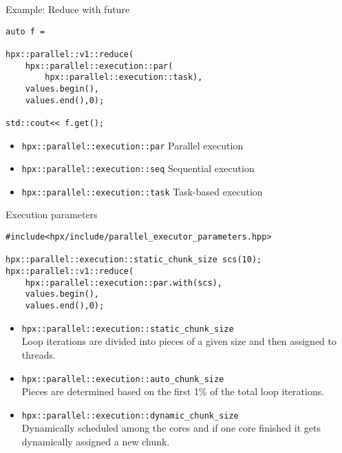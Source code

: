 \documentclass[12pt,t]{beamer}
\begin{document}
\begin{frame}[fragile]{Example: Reduce with future}


\begin{lstlisting}
auto f =

hpx::parallel::v1::reduce(
	hpx::parallel::execution::par(
		hpx::parallel::execution::task),
	values.begin(),
	values.end(),0);

std::cout<< f.get();
\end{lstlisting}

\begin{itemize}
\item \lstinline|hpx::parallel::execution::par| Parallel execution
\item \lstinline|hpx::parallel::execution::seq| Sequential execution
\item \lstinline|hpx::parallel::execution::task| Task-based execution
\end{itemize}

\end{frame}


\begin{frame}[fragile]{Execution parameters}


\begin{lstlisting}
#include<hpx/include/parallel_executor_parameters.hpp>

hpx::parallel::execution::static_chunk_size scs(10);
hpx::parallel::v1::reduce(
	hpx::parallel::execution::par.with(scs),
	values.begin(),
	values.end(),0);
\end{lstlisting}

\begin{itemize}
\item \lstinline|hpx::parallel::execution::static_chunk_size| \\
Loop iterations are divided into pieces of a given size and then assigned to threads.
\item \lstinline|hpx::parallel::execution::auto_chunk_size| \\
Pieces are determined based on the first 1\% of the total loop iterations. 
\item \lstinline|hpx::parallel::execution::dynamic_chunk_size| \\
Dynamically scheduled among the cores and if one core finished it gets dynamically assigned a new chunk.


\end{itemize}

\end{frame}
\end{document}
